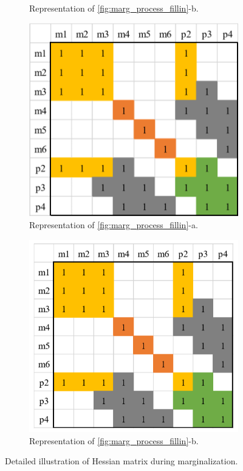 \documentclass[12pt]{report}   %
\begin{document}
\begin{figure}[H]
\begin{subfigure}[t]{.4\linewidth}
		\caption{Representation of \ref{fig:marg_process_fillin}-b.}
	\end{subfigure}
	\begin{subfigure}[t]{.4\linewidth}
	\centering\includegraphics[width=.8\linewidth]{figures/marg_03.png}
	\caption{Representation of \ref{fig:marg_process_fillin}-a.}
\end{subfigure}
\begin{subfigure}[t]{.4\linewidth}
	\centering\includegraphics[width=.8\linewidth]{figures/marg_04.png}
	\caption{Representation of \ref{fig:marg_process_fillin}-b.}
\end{subfigure}
\caption{Detailed illustration of Hessian matrix during marginalization.}
\end{figure}
\end{document}
